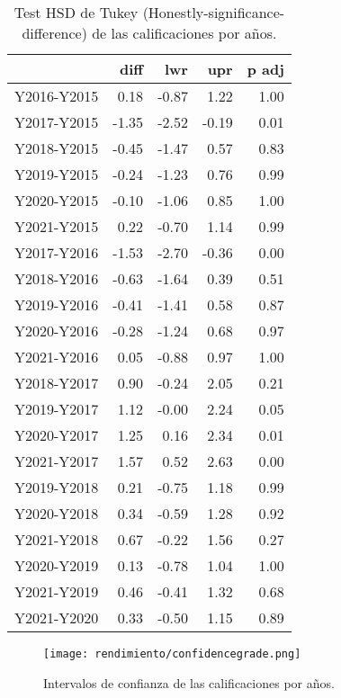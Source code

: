 \begin{table}[H]
\centering
\caption{Test HSD de Tukey (Honestly-significance-difference) de las calificaciones por años.}
\label{tab:Tukeyachiever}
\begin{tabular}{rrrrr}
  \hline
 & diff & lwr & upr & p adj \\ 
  \hline
Y2016-Y2015 & 0.18 & -0.87 & 1.22 & 1.00 \\ 
  Y2017-Y2015 & -1.35 & -2.52 & -0.19 & 0.01 \\ 
  Y2018-Y2015 & -0.45 & -1.47 & 0.57 & 0.83 \\ 
  Y2019-Y2015 & -0.24 & -1.23 & 0.76 & 0.99 \\ 
  Y2020-Y2015 & -0.10 & -1.06 & 0.85 & 1.00 \\ 
  Y2021-Y2015 & 0.22 & -0.70 & 1.14 & 0.99 \\ 
  Y2017-Y2016 & -1.53 & -2.70 & -0.36 & 0.00 \\ 
  Y2018-Y2016 & -0.63 & -1.64 & 0.39 & 0.51 \\ 
  Y2019-Y2016 & -0.41 & -1.41 & 0.58 & 0.87 \\ 
  Y2020-Y2016 & -0.28 & -1.24 & 0.68 & 0.97 \\ 
  Y2021-Y2016 & 0.05 & -0.88 & 0.97 & 1.00 \\ 
  Y2018-Y2017 & 0.90 & -0.24 & 2.05 & 0.21 \\ 
  Y2019-Y2017 & 1.12 & -0.00 & 2.24 & 0.05 \\ 
  Y2020-Y2017 & 1.25 & 0.16 & 2.34 & 0.01 \\ 
  Y2021-Y2017 & 1.57 & 0.52 & 2.63 & 0.00 \\ 
  Y2019-Y2018 & 0.21 & -0.75 & 1.18 & 0.99 \\ 
  Y2020-Y2018 & 0.34 & -0.59 & 1.28 & 0.92 \\ 
  Y2021-Y2018 & 0.67 & -0.22 & 1.56 & 0.27 \\ 
  Y2020-Y2019 & 0.13 & -0.78 & 1.04 & 1.00 \\ 
  Y2021-Y2019 & 0.46 & -0.41 & 1.32 & 0.68 \\ 
  Y2021-Y2020 & 0.33 & -0.50 & 1.15 & 0.89 \\ 
   \hline
\end{tabular}
\end{table}

\begin{figure}[H]
    \centering
    \texttt{[image: rendimiento/confidencegrade.png]}
    \caption{Intervalos de confianza de las calificaciones por años.}
    \label{fig:confidenceachiever}
\end{figure}

